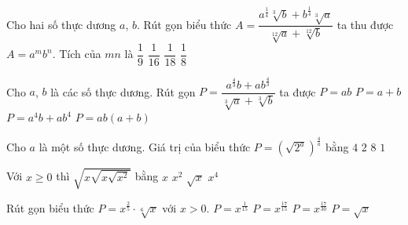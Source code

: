 \begin{ex}%
	Cho hai số thực dương $a$, $b$. Rút gọn biểu thức $A=\dfrac{a^{\tfrac14}\sqrt[3]{b}+b^{\tfrac14}\sqrt[3]{a}}{\sqrt[12]{a}+\sqrt[12]{b}}$ ta thu được  $A=a^{m}b^{n}$. Tích của $mn$ là
	\choice 
		{$\dfrac19$} 
		{\True $\dfrac1{16}$} 
		 {$\dfrac1{18}$}
		{$\dfrac18$} 
\end{ex}

\begin{ex}%
	 Cho $a$, $b$ là các số thực dương. Rút gọn $P=\dfrac{a^{\tfrac{4}{3}}b+ab^{\tfrac{4}{3}}}{\sqrt[3]{a}+\sqrt[3]{b}}$ ta được
	\choice 
		 {\True $P=ab$}
		 {$P=a+b$}
		{$P=a^4b+ab^4$} 
		{$P=ab\left(a+b\right)$} 
\end{ex}

\begin{ex}%
	Cho $a$  là một số thực dương. Giá trị của biểu thức $P=\left(\sqrt{2^a}\right)^{\tfrac{4}{a}}$ bằng
	\choice 
		 {\True $4$}
		{$2$} 
		 {$8$}
		 {$1$}
\end{ex}

\begin{ex}%
	 Với $x\ge 0$ thì $\sqrt{x\sqrt{x\sqrt{x^2}}}$ bằng
	 \choice
		 {\True $x$}
		 {$x^2$}
		{$\sqrt{x}$} 
		 {$x^4$}
\end{ex}

\begin{ex}%
	Rút gọn biểu thức  $P=x^{\tfrac{2}{5}}\cdot \sqrt[6]{x}$ với $x>0$.
	\choice 
		 {$P=x^{\tfrac{1}{15}}$}
		{$P=x^{\tfrac{17}{15}}$} 
		{\True  $P=x^{\tfrac{17}{30}}$}
		{$P=\sqrt{x}$} 
\end{ex}

